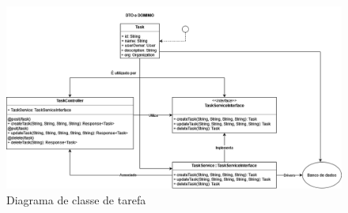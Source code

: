 \begin{figure}[h]
    \centering
    \includegraphics[width=1\textwidth]{../figures/tarefa-Task.png}
    \caption{Diagrama de classe de tarefa}
    \label{fig:task}
\end{figure}